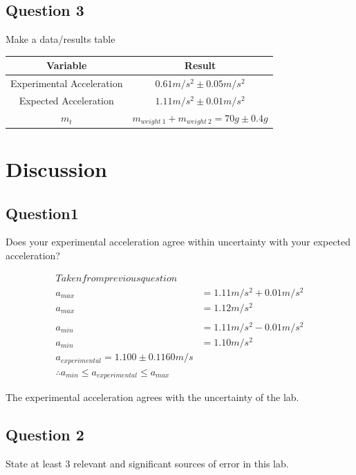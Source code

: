 \documentclass[12pt]{article}
\begin{document}
\subsection{Question 3}
Make a data/results table

\begin{center}
	\begin{tabular}{|c|c|}
		\hline
		Variable & Result\\
		\hline \hline
		Experimental Acceleration & $0.61m/s^2\pm0.05m/s^2$\\
		\hline
		Expected Acceleration & $1.11m/s^2 \pm 0.01m/s^2$\\
		\hline
		$m_{t}$ & $m_{weight\ 1} + m_{weight\ 2} = 70g\pm0.4g$\\
		\hline
	\end{tabular}
\end{center}


\section{Discussion}

\subsection{Question1}
Does your experimental acceleration agree within uncertainty with your expected acceleration?

\begin{align*}
Taken from previous question\\
a_{max}		& = 1.11m/s^2 + 0.01m/s^2\\
a_{max} 	& = 1.12m/s^2\\
\\
a_{min}		& = 1.11m/s^2 - 0.01m/s^2\\
a_{min}		& = 1.10m/s^2
\\
a_{experimental} = 1.100\pm0.1160m/s\\
\therefore a_{min}\leq a_{experimental}\leq  a_{max}
\end{align*}

The experimental acceleration agrees with the uncertainty of the lab.

\pagebreak

\subsection{Question 2}
State at least 3 relevant and significant sources of error in this lab.
\end{document}

